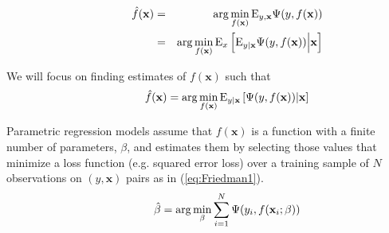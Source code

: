 \documentclass{article}
\newcommand{\EV}{\mathrm{E}}
\begin{document}
\begin{eqnarray}
\hspace{0.5in}
\hat f(\mathbf{x}) &=& \arg \min_{f(\mathbf{x})} \EV_{y,\mathbf{x}} \Psi(y,f(\mathbf{x})) \nonumber \\ \label{NonparametricRegression1}
&=& \arg \min_{f(\mathbf{x})} \EV_x \left[ \EV_{y|\mathbf{x}} \Psi(y,f(\mathbf{x})) \Big| \mathbf{x} \right]
\end{eqnarray}

We will focus on finding estimates of $f(\mathbf{x})$ such that
\begin{equation}
\label{NonparametricRegression2}
\hspace{0.5in}
\hat f(\mathbf{x}) = \arg \min_{f(\mathbf{x})} \EV_{y|\mathbf{x}} \left[ \Psi(y,f(\mathbf{x}))|\mathbf{x} \right]
\end{equation}

Parametric regression models assume that $f(\mathbf{x})$ is a function
with a finite number of parameters, $\beta$, and estimates them by
selecting those values that minimize a loss function (e.g. squared
error loss) over a training sample of $N$ observations on
$(y,\mathbf{x})$ pairs as in (\ref{eq:Friedman1}).
\begin{equation}
\label{eq:Friedman1}
\hspace{0.5in}
\hat\beta = \arg \min_{\beta} \sum_{i=1}^N \Psi(y_i,f(\mathbf{x}_i;\beta))
\end{equation}
\end{document}
